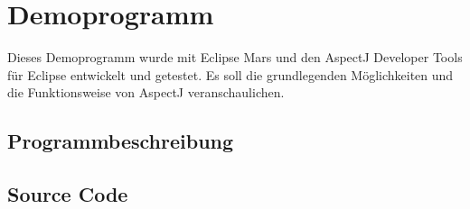 \chapter{Demoprogramm}
\label{chap:demoprogramm}
Dieses Demoprogramm wurde mit Eclipse Mars und den AspectJ Developer Tools f\"{u}r Eclipse entwickelt und getestet. Es soll die grundlegenden M\"{o}glichkeiten und die Funktionsweise von AspectJ veranschaulichen.
\section{Programmbeschreibung}
\label{demo_beschreibung}

\section{Source Code}
\label{demo_source}